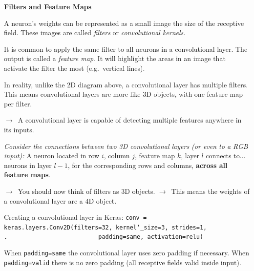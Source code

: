 \newpage

\textbf{\underline{Filters and Feature Maps}}

A neuron's weights can be represented as a small image the size of the receptive field.\newline
These images are called \textit{filters} or \textit{convolutional kernels}.

It is common to apply the same filter to all neurons in a convolutional layer.\newline
The output is called a \textit{feature map}.\newline
It will highlight the areas in an image that activate the filter the most (e.g.~vertical lines).

In reality,
unlike the 2D diagram above,
a convolutional layer has multiple filters.\newline
This means convolutional layers are more like 3D objects,
with one feature map per filter.

$\rightarrow$~A convolutional layer is capable of detecting multiple features
anywhere in its inputs.

\textit{Consider the connections between two 3D convolutional layers (or even to a RGB input):}\newline
A neuron located in row $i$, column $j$, feature map $k$, layer $l$ connects to...\newline
neurons in layer $l-1$, for the corresponding rows and columns, \textbf{across all feature maps}.

$\rightarrow$~You should now think of filters as 3D objects.\newline
$\rightarrow$~This means the weights of a convolutional layer are a 4D object.

Creating a convolutional layer in Keras:\newline
\texttt{conv = keras.layers.Conv2D(filters=32, kernel\char`_size=3, strides=1,\newline
.~~~~~~~~~~~~~~~~~~~~~~~~~~padding=\textquotesingle same\textquotesingle, activation=\textquotesingle relu\textquotesingle)}

When \texttt{padding=\textquotesingle same\textquotesingle}
the convolutional layer uses zero padding if necessary.\newline
When \texttt{padding=\textquotesingle valid\textquotesingle}
there is no zero padding (all receptive fields valid inside input).\newline\newline

